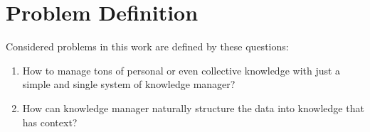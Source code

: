 \section{Problem Definition}
\label{sec:problem-definition}

Considered problems in this work are defined by these questions:

\begin{enumerate}
\item How to manage tons of personal or even collective knowledge with just a simple and single system of knowledge manager?
\item How can knowledge manager naturally structure the data into knowledge that has context?
\end{enumerate}


